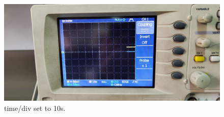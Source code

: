 \documentclass[11pt]{article}
\newcommand{\PicScale}{0.2}
\begin{document}
\begin{question}
{        \begin{figure}[H]
            \begin{center}
                \includegraphics[scale=\PicScale]{Fig/6.jpeg}
                \caption{time/div set to 10s.}
            \end{center}
        \end{figure}

    }

\end{question}

\end{document}
